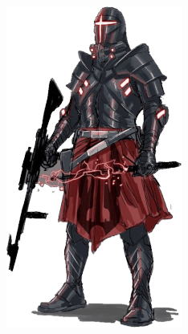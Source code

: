 \begin{figure}
    \vspace{-4\baselineskip}
    \centering\hspace*{-.99\columnsep}\includegraphics[width=1.2\linewidth]{_img/bestiary/citadel-guard.png}
    \vspace{-1\baselineskip} 
\end{figure}

